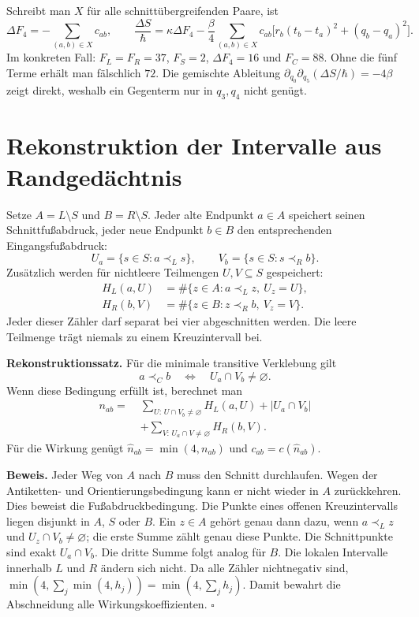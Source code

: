\documentclass[10pt,a4paper]{article}
\begin{document}
Schreibt man $X$ für alle schnittübergreifenden Paare, ist
\[
 \Delta F_4=-\sum_{(a,b)\in X}c_{ab},\qquad
 \frac{\Delta S}{\hbar}
 =\kappa\Delta F_4-\frac{\beta}{4}
 \sum_{(a,b)\in X}c_{ab}
 \bigl[r_b(t_b-t_a)^2+(q_b-q_a)^2\bigr].                      \tag{2}
\]
Im konkreten Fall: $F_L=F_R=37$, $F_S=2$, $\Delta F_4=16$ und
$F_C=88$. Ohne die fünf Terme erhält man fälschlich $72$.
Die gemischte Ableitung
$\partial_{q_0}\partial_{q_5}(\Delta S/\hbar)=-4\beta$
zeigt direkt, weshalb ein Gegenterm nur in $q_3,q_4$ nicht genügt.
\newpage

\section{Rekonstruktion der Intervalle aus Randgedächtnis}
Setze $A=L\setminus S$ und $B=R\setminus S$. Jeder alte Endpunkt $a\in A$
speichert seinen Schnittfußabdruck, jeder neue Endpunkt $b\in B$ den
entsprechenden Eingangsfußabdruck:
\[
 U_a=\{s\in S:a\prec_L s\},\qquad
 V_b=\{s\in S:s\prec_R b\}.
\]
Zusätzlich werden für nichtleere Teilmengen $U,V\subseteq S$ gespeichert:
\begin{align*}
 H_L(a,U)&=\#\{z\in A:a\prec_L z,\ U_z=U\},\\
 H_R(b,V)&=\#\{z\in B:z\prec_R b,\ V_z=V\}.
\end{align*}
Jeder dieser Zähler darf separat bei vier abgeschnitten werden.
Die leere Teilmenge trägt niemals zu einem Kreuzintervall bei.

\textbf{Rekonstruktionssatz.}
Für die minimale transitive Verklebung gilt
\[
 a\prec_C b\quad\Longleftrightarrow\quad U_a\cap V_b\ne\varnothing .
\]
Wenn diese Bedingung erfüllt ist, berechnet man
\[
 \boxed{
 \begin{aligned}
 n_{ab}=\;&
 \sum_{U:\,U\cap V_b\ne\varnothing} H_L(a,U)
 +|U_a\cap V_b|\\
 &+\sum_{V:\,U_a\cap V\ne\varnothing} H_R(b,V).
 \end{aligned}}                                                 \tag{3}
\]
Für die Wirkung genügt $\widehat n_{ab}=\min(4,n_{ab})$ und
$c_{ab}=c(\widehat n_{ab})$.

\textbf{Beweis.}
Jeder Weg von $A$ nach $B$ muss den Schnitt durchlaufen. Wegen der
Antiketten- und Orientierungsbedingung kann er nicht wieder in $A$
zurückkehren. Dies beweist die Fußabdruckbedingung. Die Punkte eines offenen
Kreuzintervalls liegen disjunkt in $A$, $S$ oder $B$.
Ein $z\in A$ gehört genau dann dazu, wenn $a\prec_L z$ und
$U_z\cap V_b\ne\varnothing$; die erste Summe zählt genau diese Punkte.
Die Schnittpunkte sind exakt $U_a\cap V_b$. Die dritte Summe folgt analog
für $B$. Die lokalen Intervalle innerhalb $L$ und $R$ ändern sich nicht.
Da alle Zähler nichtnegativ sind,
$\min(4,\sum_j\min(4,h_j))=\min(4,\sum_j h_j)$.
Damit bewahrt die Abschneidung alle Wirkungskoeffizienten. \hfill$\square$
\end{document}
